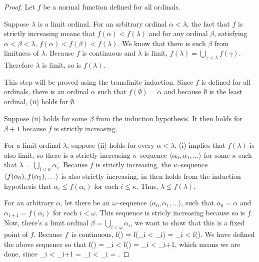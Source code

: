 \begin{proof}
Let $f$ be a normal function defined for all ordinals.
\bce[(i)]
\item
Suppose $\lambda$ is a limit ordinal. 
For an arbitrary ordinal $\alpha < \lambda$, the fact that $f$ is strictly increasing means that $f(\alpha) < f(\lambda)$ and for any ordinal $\beta$, 
satisfying $\alpha < \beta < \lambda$, $f(\alpha) < f(\beta) < f(\lambda)$. 
We know that there is such $\beta$ from limitness of $\lambda$.
Because $f$ is continuous and $\lambda$ is limit, $f(\lambda) = \bigcup_{\gamma < \lambda} f(\gamma)$.%
Therefore $\lambda$ is limit, so is $f(\lambda)$.

\item This step will be proved using the transfinite induction.
Since $f$ is defined for all ordinals, there is an ordinal $\alpha$ such that $f(\emptyset) = \alpha$ and because $\emptyset$ is the least ordinal, (ii) holds for $\emptyset$.

Suppose (ii) holds for some $\beta$ from the induction hypothesis. It then holds for $\beta+1$ because $f$ is strictly increasing. 

For a limit ordinal $\lambda$, suppose (ii) holds for every $\alpha < \lambda$. (i) implies that $f(\lambda)$ is also limit, 
so there is a strictly increasing $\kappa$–sequence $\langle \alpha_0, \alpha_1, \ldots \rangle$ for some $\kappa$ such that $\lambda = \bigcup_{i<\kappa} \alpha_i$. Because $f$ is strictly increasing, the $\kappa$–sequence $\langle f(\alpha_0), f(\alpha_1), \ldots \rangle$ is also strictly increasing, in then holds from the induction hypothesis that $\alpha_i \leq f(\alpha_i)$ for each $i \leq \kappa$. 
Thus, $\lambda \leq f(\lambda)$.

\item For an arbitrary $\alpha$, let there be an $\omega$–sequence $\langle \alpha_0, \alpha_1, \ldots \rangle$, 
such that $\alpha_0 = \alpha$ and $\alpha_{i+1} = f(\alpha_i)$ for each $i < \omega$.
This sequence is stricly increasing because so is $f$. 
Now, there's a limit ordinal $\beta = \bigcup_{i < \omega} \alpha_i$, we want to show that this is a fixed point of $f$. 
Because $f$~is continuous,
\beq
f(\beta) = f(\bigcup_{i < \omega} \alpha_i) = \bigcup_{i < \omega} f(\alpha)\mbox{.}
\eeq 
We have defined the above sequence so that 
\beq
f(\beta) = \bigcup_{i < \omega} f(\alpha) = \bigcup_{i < \omega} \alpha_{i+1}\mbox{,}
\eeq 
which means we are done, since 
\beq
\bigcup_{i < \omega} \alpha_{i+1} = \bigcup_{i < \omega} \alpha_{i}  = \beta\mbox{.}
\eeq


\end{proof}
